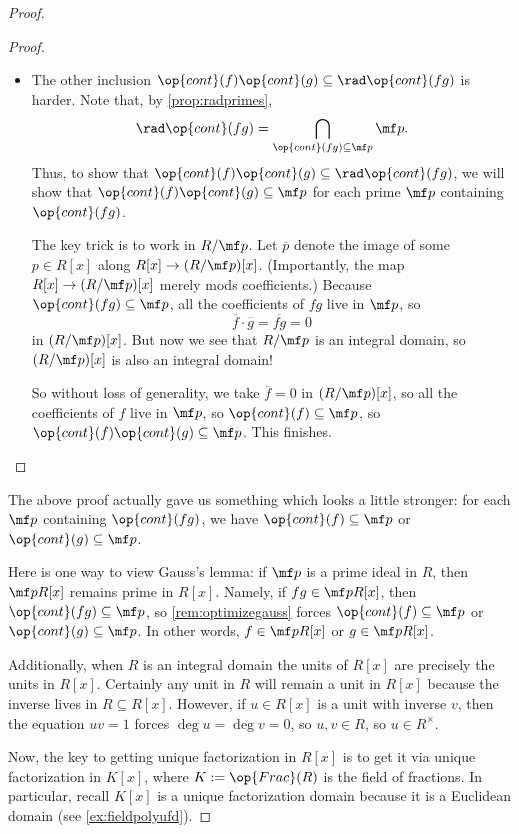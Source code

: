 \begin{proof}
\begin{proof}
\begin{itemize}
			\item The other inclusion $\op{cont}(f)\op{cont}(g)\subseteq\rad\op{cont}(fg)$ is harder. Note that, by \autoref{prop:radprimes},
			\[\rad\op{cont}(fg)=\bigcap_{\op{cont}(fg)\subseteq\mf p}\mf p.\]
			Thus, to show that $\op{cont}(f)\op{cont}(g)\subseteq\rad\op{cont}(fg)$, we will show that $\op{cont}(f)\op{cont}(g)\subseteq\mf p$ for each prime $\mf p$ containing $\op{cont}(fg)$.

			The key trick is to work in $R/\mf p$. Let $\overline p$ denote the image of some $p\in R[x]$ along $R[x]\to(R/\mf p)[x]$. (Importantly, the map $R[x]\to(R/\mf p)[x]$ merely mods coefficients.) Because $\op{cont}(fg)\subseteq\mf p$, all the coefficients of $fg$ live in $\mf p$, so
			\[\overline f\cdot\overline g=\overline{fg}=0\]
			in $(R/\mf p)[x]$. But now we see that $R/\mf p$ is an integral domain, so $(R/\mf p)[x]$ is also an integral domain!
			
			So without loss of generality, we take $\overline f=0$ in $(R/\mf p)[x]$, so all the coefficients of $f$ live in $\mf p$, so $\op{cont}(f)\subseteq\mf p$, so $\op{cont}(f)\op{cont}(g)\subseteq\mf p$. This finishes.
			\qedhere
		\end{itemize}
	\end{proof}
	\begin{remark}[Nir] \label{rem:optimizegauss}
		The above proof actually gave us something which looks a little stronger: for each $\mf p$ containing $\op{cont}(fg)$, we have $\op{cont}(f)\subseteq\mf p$ or $\op{cont}(g)\subseteq\mf p$.
	\end{remark}
	\begin{remark}[Nir] \label{rem:primeslift}
		Here is one way to view Gauss's lemma: if $\mf p$ is a prime ideal in $R$, then $\mf pR[x]$ remains prime in $R[x]$. Namely, if $fg\in\mf pR[x]$, then $\op{cont}(fg)\subseteq\mf p$, so \autoref{rem:optimizegauss} forces $\op{cont}(f)\subseteq\mf p$ or $\op{cont}(g)\subseteq\mf p$. In other words, $f\in\mf pR[x]$ or $g\in\mf pR[x]$.
	\end{remark}
	\begin{remark}[Nir] \label{rem:unitslift}
		Additionally, when $R$ is an integral domain the units of $R[x]$ are precisely the units in $R[x]$. Certainly any unit in $R$ will remain a unit in $R[x]$ because the inverse lives in $R\subseteq R[x]$. However, if $u\in R[x]$ is a unit with inverse $v$, then the equation $uv=1$ forces $\deg u=\deg v=0$, so $u,v\in R$, so $u\in R^\times$.
	\end{remark}
	Now, the key to getting unique factorization in $R[x]$ is to get it via unique factorization in $K[x]$, where $K:=\op{Frac}(R)$ is the field of fractions. In particular, recall $K[x]$ is a unique factorization domain because it is a Euclidean domain (see \autoref{ex:fieldpolyufd}).


\end{proof}
